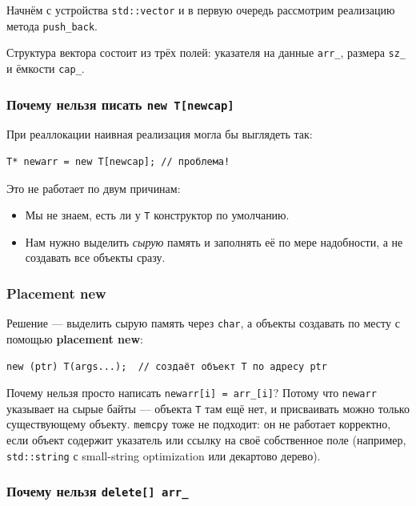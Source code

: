 \documentclass[a4paper,12pt]{article}
\begin{document}
Начнём с устройства \texttt{std::vector} и в первую очередь рассмотрим
реализацию метода \texttt{push\_back}.

Структура вектора состоит из трёх полей: указателя на данные \texttt{arr\_},
размера \texttt{sz\_} и ёмкости \texttt{cap\_}.

\subsubsection{Почему нельзя писать \texttt{new T[newcap]}}

При реаллокации наивная реализация могла бы выглядеть так:

\begin{lstlisting}
T* newarr = new T[newcap]; // проблема!
\end{lstlisting}

Это не работает по двум причинам:
\begin{itemize}
    \item Мы не знаем, есть ли у \texttt{T} конструктор по умолчанию.
    \item Нам нужно выделить \textit{сырую} память и заполнять её по мере
          надобности, а не создавать все объекты сразу.
\end{itemize}

\subsubsection{Placement new}

Решение --- выделить сырую память через \texttt{char}, а объекты
создавать по месту с помощью \textbf{placement new}:

\begin{lstlisting}
new (ptr) T(args...);  // создаёт объект T по адресу ptr
\end{lstlisting}

Почему нельзя просто написать \texttt{newarr[i] = arr\_[i]}?
Потому что \texttt{newarr} указывает на сырые байты --- объекта
\texttt{T} там ещё нет, и присваивать можно только существующему объекту.
\texttt{memcpy} тоже не подходит: он не работает корректно, если объект
содержит указатель или ссылку на своё собственное поле
(например, \texttt{std::string} с small-string optimization или
декартово дерево).

\subsubsection{Почему нельзя \texttt{delete[] arr\_}}
\end{document}
